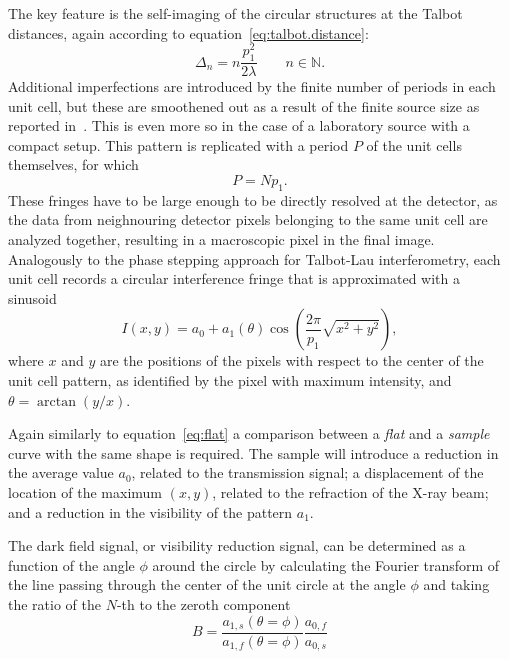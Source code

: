 The key feature is the self-imaging of the circular structures 
at the Talbot distances, again according to
equation~\ref{eq:talbot.distance}:
\begin{equation*}
    \Delta_n = n \frac{p_1^2}{2 \lambda} \qquad n \in
    \mathbb{N}.
\end{equation*}
Additional imperfections are introduced by the finite number of periods in
each unit cell, but these are smoothened out as a result of the finite
source size as reported in~\cite{PhysRevLett.116.093902}. This is even
more so in the case of a laboratory source with a compact setup.
This pattern is replicated with a period $P$ of the unit cells themselves,
for which
\begin{equation}
    P = Np_1.
    \label{eq:unit.cell.periop}
\end{equation}
These fringes have to be large enough to be directly resolved at the
detector, as the data from neighnouring detector pixels belonging to the same
unit cell are analyzed together, resulting in a macroscopic pixel in the final image. Analogously to
the phase stepping approach for Talbot-Lau interferometry, each unit cell
records a circular interference fringe that is approximated with a sinusoid
\begin{equation}
    I(x, y) = a_0 + a_1(\theta)\cos\left(\frac{2\pi}{p_1} \sqrt{x^2 +
    y^2}\right),
    \label{eq:omnidirectional.periodical.signal}
\end{equation}
where $x$ and $y$ are the positions of the pixels with respect to the center
of the unit cell pattern, as identified by the pixel with maximum intensity,
and $\theta = \arctan(y/x)$.

Again similarly to equation~\ref{eq:flat} a comparison between a
\emph{flat} and a \emph{sample} curve with the same shape is required. The
sample will introduce a reduction in the average value $a_0$, related to the
transmission signal; a displacement of the location of the maximum $(x, y)$,
related to the refraction of the X-ray beam; and a reduction in the
visibility of the pattern $a_1$. 

The dark field signal, or visibility reduction signal, can be
determined as a function of the angle $\phi$ around the circle by
calculating the Fourier transform of the line passing through the center of
the unit circle at the angle $\phi$ and taking the ratio of the $N$-th to
the zeroth component
\begin{equation}
    B = \frac{a_{1,s}(\theta = \phi)}{a_{1,f}(\theta =
\phi)}\frac{a_{0,f}}{a_{0,s}}
    \label{eq:dark-field-omnidirectional}
\end{equation}

